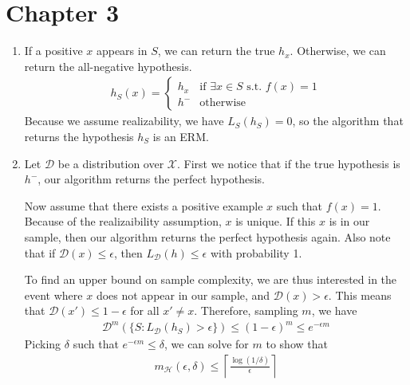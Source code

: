\documentclass[10pt]{article}
\newenvironment{problem}[2][Problem]{\begin{trivlist}
\item[\hskip \labelsep {\bfseries #1}\hskip \labelsep {\bfseries #2.}]}{\end{trivlist}}
\begin{document}
\section{Chapter 3}

\begin{problem}{2}
    \hfill
    \begin{enumerate}
        \item 
        If a positive $x$ appears in $S$, we can return the true $h_x$. Otherwise, we can return the all-negative hypothesis.
        \begin{align*}
            h_S(x) = \begin{cases}
                h_x & \text{if } \exists x \in S \text{ s.t. } f(x) = 1\\
                h^- & \text{otherwise}
            \end{cases}
        \end{align*}
        Because we assume realizability, we have $L_S(h_S) = 0$, so the algorithm that returns the hypothesis $h_S$ is an ERM.
        \item 
            Let $\mathcal{D}$ be a distribution over $\mathcal{X}$.
            First we notice that if the true hypothesis is $h^-$, our algorithm returns the perfect hypothesis.

            Now assume that there exists a positive example $x$ such that $f(x) = 1$. Because of the realizaibility assumption, $x$ is unique. If this $x$ is in our sample, then our algorithm returns the perfect hypothesis again. Also note that if $\mathcal{D}(x) \leq \epsilon$, then $L_{\mathcal{D}}(h) \leq \epsilon$ with probability 1.

            To find an upper bound on sample complexity, we are thus interested in the event where $x$ does not appear in our sample, and $\mathcal{D}(x) > \epsilon$.
            This means that $\mathcal{D}(x') \leq 1 - \epsilon$ for all $x' \neq x$.
            Therefore, sampling $m$, we have
            \begin{align*}
                \mathcal{D}^m(\{S : L_{\mathcal{D}}(h_S) > \epsilon\}) \leq (1 - \epsilon)^m \leq e^{-\epsilon m}
            \end{align*}
            Picking $\delta$ such that $e^{-\epsilon m} \leq \delta$, we can solve for $m$ to show that 
            \begin{align*}
                m_\mathcal{H}(\epsilon, \delta) \leq \left\lceil\frac{\log(1/\delta)}{\epsilon}\right\rceil
            \end{align*}


    \end{enumerate}
\end{problem}
\end{document}
